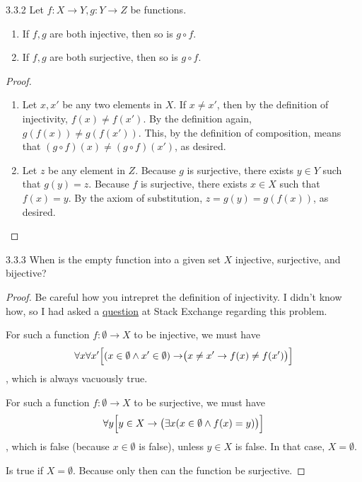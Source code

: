 \begin{exercise}{3.3.2}
	Let $f: X \to Y, g: Y \to Z$ be functions.
	\begin{enumerate}
		\item If $f,g$ are both injective, then so is $g \circ f$.
		\item If $f,g$ are both surjective, then so is $g \circ f$.
	\end{enumerate}
\end{exercise}
\begin{proof}\leavevmode
	\begin{enumerate}
		\item Let $x, x'$ be any two elements in $X$. If $x \ne x'$, then by the definition of injectivity, $f(x) \ne f(x')$. By the definition again,
		$g(f(x)) \ne g(f(x'))$. This, by the definition of composition, means that $(g \circ f)(x) \ne (g \circ f)(x')$, as desired.
		
		\item Let $z$ be any element in $Z$. Because $g$ is surjective, there exists $y \in Y$ such that $g(y) = z$. Because $f$ is surjective, there exists $x \in X$ such that $f(x) = y$. 
		By the axiom of substitution, $z = g(y) = g(f(x))$, as desired.
	\end{enumerate}
\end{proof}

\begin{exercise}{3.3.3}
	When is the empty function into a given set $X$ injective, surjective, and bijective?
\end{exercise}
\begin{proof}
	Be careful how you intrepret the definition of injectivity. I didn't know how, so I had asked a \href{https://math.stackexchange.com/questions/3800240/how-to-interpret-the-definition-of-injectivity}{question} at Stack Exchange regarding this problem.

	 For such a function $f: \emptyset \to X$ to be injective, we must have
	\[
	\forall x \forall x'\Bigl[(x \in \emptyset \wedge x' \in \emptyset) \to \bigr(x \ne x' \to f(x) \ne f(x')\bigl)\Bigr]
	\]
	, which is always vacuously true.
	
	 For such a function $f: \emptyset \to X$ to be surjective, we must have
	\[
	\forall y\Bigl[y \in X \to \bigl(\exists x(x \in \emptyset \wedge f(x) = y)\bigr)\Bigr]
	\]
	, which is false (because $x \in \emptyset$ is false), unless $y \in X$ is false. In that case, $X = \emptyset$.
	
	 Is true if $X = \emptyset$. Because only then can the function be surjective.
\end{proof}

